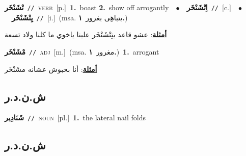 \documentclass[10pt,a4paper,twoside]{article} %
\begin{document}
\begin{multicols}{2}
{\setlength\topsep{0pt}\textbf{\foreignlanguage{arabic}{تْشَنْخَر}}\ {\color{gray}\texttt{//}\color{black}}\ \textsc{verb}\ [p.]\ \textbf{1.}~boast  \textbf{2.}~show off arrogantly\ \ $\bullet$\ \ \setlength\topsep{0pt}\textbf{\foreignlanguage{arabic}{اِتْشَنْخَر}}\ {\color{gray}\texttt{//}\color{black}}\ [c.]\ \ $\bullet$\ \ \setlength\topsep{0pt}\textbf{\foreignlanguage{arabic}{يِتْشَنْخَر}}\ {\color{gray}\texttt{//}\color{black}}\ [i.]\ \color{gray}(msa. \foreignlanguage{arabic}{يتباهِى بغرور}~\foreignlanguage{arabic}{\textbf{١.}})\color{black}\  \begin{flushright}\color{gray}\foreignlanguage{arabic}{\textbf{\underline{\foreignlanguage{arabic}{أمثلة}}}: عشو قاعد بتِتْشَنْخَر علينا ياخوي ما كلنا ولاد تسعة}\end{flushright}\color{black}} \vspace{2mm}

{\setlength\topsep{0pt}\textbf{\foreignlanguage{arabic}{مْشَنْخَر}}\ {\color{gray}\texttt{//}\color{black}}\ \textsc{adj}\ [m.]\ \color{gray}(msa. \foreignlanguage{arabic}{مغرور}~\foreignlanguage{arabic}{\textbf{١.}})\color{black}\ \textbf{1.}~arrogant\  \begin{flushright}\color{gray}\foreignlanguage{arabic}{\textbf{\underline{\foreignlanguage{arabic}{أمثلة}}}: أنا بحبوش عشانه مشَنْخَر}\end{flushright}\color{black}} \vspace{2mm}

\vspace{-3mm}
\subsection*{\color{blue}\foreignlanguage{arabic}{ش.ن.د.ر}\color{blue}{}} 

{\setlength\topsep{0pt}\textbf{\foreignlanguage{arabic}{شَنَادِير}}\ {\color{gray}\texttt{//}\color{black}}\ \textsc{noun}\ [pl.]\ \textbf{1.}~the lateral nail folds\ } \vspace{2mm}

\vspace{-3mm}
\subsection*{\color{blue}\foreignlanguage{arabic}{ش.ن.د.ر}\color{blue}{ (ntws)}} 


\end{multicols}
\end{document}
